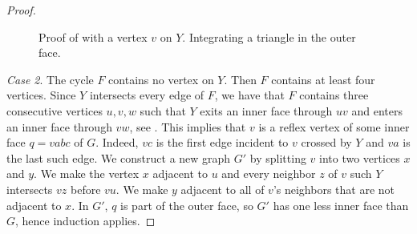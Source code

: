 \begin{proof}
	\begin{figure}[htb]
		\caption{Proof of  with a vertex
			$v$ on $Y$. Integrating a triangle in the outer face.}
	\end{figure}
	
	
	
	
	{\em Case 2}. The cycle $F$ contains no vertex on $Y$.
	Then $F$ contains at least four vertices. Since $Y$ intersects
	every edge of $F$, we have that $F$
	contains three consecutive vertices
	$u,v,w$ such that $Y$ exits an inner face through $uv$ and enters
	an inner face through $vw$, see .
	This implies that $v$ is a reflex vertex
	of some inner face $q=vabc$ of $G$.  Indeed, $vc$ is the first edge
	incident to $v$ crossed by $Y$ and $va$ is the last such edge.
	We construct a new graph $G'$ by splitting $v$ into two vertices $x$
	and $y$. We make the vertex $x$ adjacent to $u$ and every neighbor
	$z$ of $v$ such $Y$ intersects $vz$ before $vu$.  We make
	$y$ adjacent to all of $v$'s neighbors that are not adjacent to $x$.
	In $G'$, $q$ is part of the outer face, so $G'$ has one less inner
	face than $G$, hence induction applies.
	

\end{proof}
